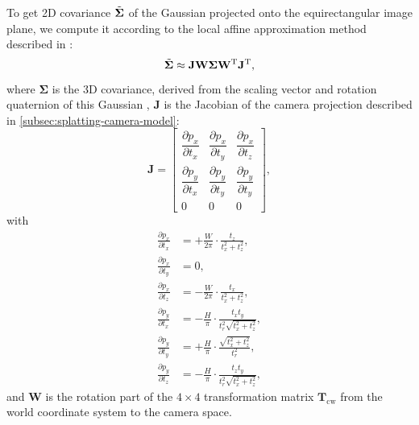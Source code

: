 \documentclass[10pt,twocolumn,letterpaper]{article}
\begin{document}
To get 2D covariance $\Tilde{\mathbf{\Sigma}}$ of the Gaussian projected onto the equirectangular image plane, we compute it according to the local affine approximation method described in \cite{3dgs:ewasplatting}:
\begin{equation}\label{equ:cov2D}
    \Tilde{\mathbf{\Sigma}} \approx \mathbf{J} \mathbf{W} \mathbf{\Sigma} \mathbf{W}^\text{T} \mathbf{J}^\text{T},
\end{equation}
where $\mathbf{\Sigma}$ is the 3D covariance, derived from the scaling vector and rotation quaternion of this Gaussian \cite{3dgs}, $\mathbf{J}$ is the Jacobian of the camera projection described in \cref{subsec:splatting-camera-model}:
\begin{equation}\label{equ:J}
    \mathbf{J} = 
    \begin{bmatrix}
        \dfrac{\partial p_x}{\partial t_x} & \dfrac{\partial p_x}{\partial t_y} & \dfrac{\partial p_x}{\partial t_z} \\[16pt]
        \dfrac{\partial p_y}{\partial t_x} & \dfrac{\partial p_y}{\partial t_y} & \dfrac{\partial p_y}{\partial t_y} \\[16pt]
        0 & 0 & 0
    \end{bmatrix}
    ,
\end{equation}
with
\begin{align}
    \frac{\partial p_x}{\partial t_x} &= +\frac{W}{2\pi}\cdot\frac{t_z}{{t_x^2 + t_z^2}}, \\
    \frac{\partial p_x}{\partial t_y} &= 0, \\
    \frac{\partial p_x}{\partial t_z} &= -\frac{W}{2\pi}\cdot\frac{t_x}{{t_x^2 + t_z^2}}, \\
    \frac{\partial p_y}{\partial t_x} &= -\frac{H}{\pi}\cdot\frac{t_x t_y}{t_r^2\sqrt{t_x^2 + t_z^2}}, \\
    \frac{\partial p_y}{\partial t_y} &= +\frac{H}{\pi}\cdot\frac{\sqrt{t_x^2 + t_z^2}}{t_r^2}, \\
    \frac{\partial p_y}{\partial t_z} &= -\frac{H}{\pi}\cdot\frac{t_z t_y}{t_r^2\sqrt{t_x^2 + t_z^2}},
\end{align}
and $\mathbf{W}$ is the rotation part of the $4\times4$ transformation matrix $\mathbf{T}_\text{cw}$ from the world coordinate system to the camera space.
\end{document}
